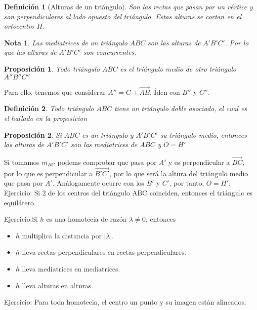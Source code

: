 \documentclass[11pt, a4paper, titlepage]{article}
\makeatletter
\renewenvironment{proof}[1][\proofname] {\vspace{-15pt}\par\pushQED{\qed}\normalfont\topsep6\p@\@plus6\p@\relax\trivlist\item[\hskip\labelsep\it#1\@addpunct{.}]\ignorespaces}{\popQED\endtrivlist\@endpefalse}
\theoremstyle{theorem-style}
\newtheorem*{nprop}{Proposición}
\theoremstyle{definition-style}
\newtheorem*{ndef}{Definición}
\theoremstyle{remark-style}
\newtheorem*{nota}{Nota}
\theoremstyle{example-style}
\makeatother
\begin{document}
\begin{ndef}[Alturas de un triángulo]
	Son las rectas que pasan por un vértice y son perpendiculares al lado opuesto del triángulo. Estas alturas se cortan en el ortocentro $H$.
\end{ndef}

\begin{nota}
	Las mediatrices de un triángulo $ABC$ son las alturas de $A'B'C'$. Por lo que las alturas de $A'B'C'$ son concurrentes.
\end{nota}

\begin{nprop}
	Todo triángulo $ABC$ es el triángulo medio de otro triángulo $A''B''C''$
\end{nprop}
\begin{proof}
	Para ello, tenemos que considerar $A'' = C+ \vec{AB}$. Íden con $B''$ y $C''$.
\end{proof}
\begin{ndef}
	Todo triángulo $ABC$ tiene un triángulo doble asociado, el cual es el hallado en la proposicion 
\end{ndef}


\begin{nprop}
	Si $ABC$ es un triángulo y $A'B'C'$ su triángulo medio, entonces las alturas de $A'B'C'$ son las mediatrices de $ABC$ y $O=H'$
\end{nprop}
\begin{proof}
	Si tomamos $m_{BC}$ podems comprobar que pasa por $A'$ y es perpendicular a $\vec{BC}$, por lo que es perpendicular a $\vec{B'C'}$, por lo que será la altura del triángulo medio que pasa por $A'$. Análogamente ocurre con los $B'$ y $C'$, por tanto, $O=H'$.
\end{proof}
Ejercicio: Si 2 de los centros del triángulo ABC coinciden, entonces el triángulo es equilátero.


Ejercicio:Si $h$ es una homotecia de razón $\lambda\ne 0$, entonces 
\begin{itemize}
	\item $h$ multiplica la distancia por $|\lambda|$.
	\item $h$ lleva rectas perpendiculares en rectas perpendiculares.
	\item $h$ lleva mediatrices en mediatrices.
	\item $h$ lleva alturas en alturas.
\end{itemize}

Ejercicio: Para toda homotecia, el centro un punto y su imagen están alineados.
\end{document}
